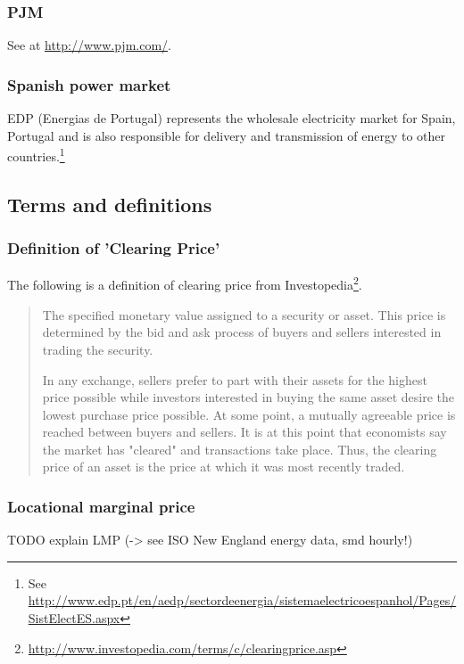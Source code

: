 \subsubsection{PJM}

See at \url{http://www.pjm.com/}. 


\subsubsection{Spanish power market}

EDP (Energias de Portugal) represents the wholesale electricity market for Spain, Portugal and is also responsible for delivery and transmission of energy to other countries.\footnote{See \url{http://www.edp.pt/en/aedp/sectordeenergia/sistemaelectricoespanhol/Pages/SistElectES.aspx}}


\subsection{Terms and definitions}

\subsubsection{Definition of 'Clearing Price'}

The following is a definition of clearing price from Investopedia\footnote{\url{http://www.investopedia.com/terms/c/clearingprice.asp}}. 

\begin{quote}
The specified monetary value assigned to a security or asset. This price is determined by the bid and ask process of buyers and sellers interested in trading the security.

In any exchange, sellers prefer to part with their assets for the highest price possible while investors interested in buying the same asset desire the lowest purchase price possible. At some point, a mutually agreeable price is reached between buyers and sellers. It is at this point that economists say the market has "cleared" and transactions take place. Thus, the clearing price of an asset is the price at which it was most recently traded.
\end{quote}


\subsubsection{Locational marginal price}

TODO explain LMP (-> see ISO New England energy data, smd hourly!)

